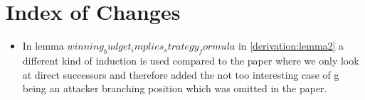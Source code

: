 \section{Index of Changes}

\begin{itemize}
    \item  In lemma $winning_budget_implies_strategy_formula$ in \ref{derivation:lemma2} a different kind of induction is used compared to the paper 
where we only look at direct successors and therefore added the not too interesting case of g being an 
attacker branching position which was omitted in the paper.
\end{itemize}
